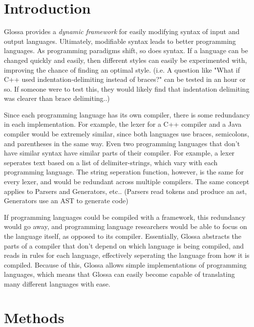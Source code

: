 \documentclass{article}
\begin{document}
\section{Introduction}

Glossa provides a \textit{dynamic framework} for easily modifying syntax of input and output languages. 
Ultimately, modifiable syntax leads to better programming languages.
As programming paradigms shift, so does syntax. 
If a language can be changed quickly and easily, then different styles can easily be experimented with, improving the chance of finding an optimal style.
(i.e. A question like "What if C++ used indentation-delimiting instead of braces?" can be tested in an hour or so. If someone were to test this, they would likely find that indentation delimiting was clearer than brace delimiting..)

Since each programming language has its own compiler, there is some redundancy in each implementation. 
For example, the lexer for a C++ compiler and a Java compiler would be extremely similar, since both languages use braces, semicolons, and parentheses in the same way.
Even two programming languages that don't have similar syntax have similar parts of their compiler. 
For example, a lexer seperates text based on a list of delimiter-strings, which vary with each programming language. The string seperation function, however, is the same for every lexer, and would be redundant across multiple compilers.
The same concept applies to Parsers and Generators, etc.. (Parsers read tokens and produce an ast, Generators use an AST to generate code)

If programming languages could be compiled with a framework, this redundancy would go away, and programming language researchers would be able to focus on the language itself, as opposed to its compiler.
Essentially, Glossa abstracts the parts of a compiler that don't depend on which language is being compiled, and reads in rules for each language, effectively seperating the language from how it is compiled. 
Because of this, Glossa allows simple implementations of programming languages, which means that Glossa can easily become capable of translating many different languages with ease.

\section{Methods}
\end{document}
